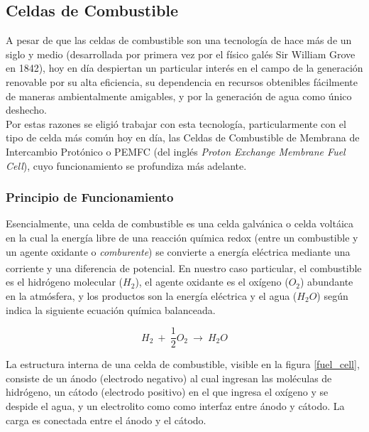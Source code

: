 \subsection{Celdas de Combustible}

A pesar de que las celdas de combustible son una tecnología de hace más de un siglo y medio (desarrollada por primera vez por el físico galés Sir William Grove en 1842), hoy en día despiertan un particular interés en el campo de la generación renovable por su alta eficiencia, su dependencia en recursos obtenibles fácilmente de maneras ambientalmente amigables, y por la generación de agua como único deshecho.\\

Por estas razones se eligió trabajar con esta tecnología, particularmente con el tipo de celda más común hoy en día, las Celdas de Combustible de Membrana de Intercambio Protónico o PEMFC (del inglés \textit{Proton Exchange Membrane Fuel Cell}), cuyo funcionamiento se profundiza más adelante.\\

\subsubsection{Principio de Funcionamiento}

Esencialmente, una celda de combustible es una celda galvánica o celda voltáica en la cual la energía libre de una reacción química redox (entre un combustible y un agente oxidante o \textit{comburente}) se convierte a energía eléctrica mediante una corriente y una diferencia de potencial.\textsuperscript{\cite{FC-FundAndAppl}} En nuestro caso particular, el combustible es el hidrógeno molecular ($H_2$), el agente oxidante es el oxígeno ($O_2$) abundante en la atmósfera, y los productos son la energía eléctrica y el agua ($H_2O$) según indica la siguiente ecuación química balanceada.

\begin{equation}\label{redox_celda}
    H_2\ +\ \frac{1}{2}O_2\ \longrightarrow\ H_2O
\end{equation}

La estructura interna de una celda de combustible, visible en la figura \ref{fuel_cell}, consiste de un ánodo (electrodo negativo) al cual ingresan las moléculas de hidrógeno, un cátodo (electrodo positivo) en el que ingresa el oxígeno y se despide el agua, y un electrolito como como interfaz entre ánodo y cátodo. La carga es conectada entre el ánodo y el cátodo.

